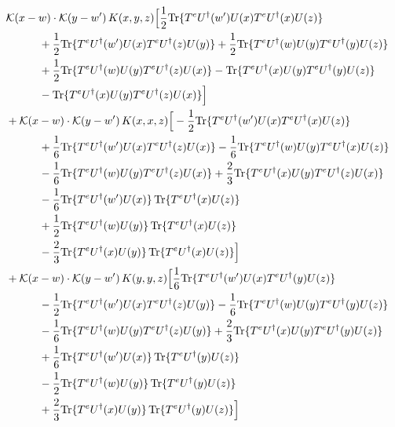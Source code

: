 \documentclass[10pt]{article}
\numberwithin{equation}{section}
\begin{document}
\begin{align}
&\mathcal K(x-w)\cdot\mathcal K(y-w')\,K(x,y,z)\Big[\frac{1}{2}{\rm Tr}\{T^eU^\dagger(w')U(x)T^eU^\dagger(x)U(z)\}\notag\\
&\quad\quad\quad+\frac{1}{2}{\rm Tr}\{T^eU^\dagger(w')U(x)T^eU^\dagger(z)U(y)\}+\frac{1}{2}{\rm Tr}\{T^eU^\dagger(w)U(y)T^eU^\dagger(y)U(z)\}\notag\\
&\quad\quad\quad+\frac{1}{2}{\rm Tr}\{T^eU^\dagger(w)U(y)T^eU^\dagger(z)U(x)\}-{\rm Tr}\{T^eU^\dagger(x)U(y)T^eU^\dagger(y)U(z)\}\notag\\
&\quad\quad\quad-{\rm Tr}\{T^eU^\dagger(x)U(y)T^eU^\dagger(z)U(x)\}\Big]\notag\\
&+\mathcal K(x-w)\cdot\mathcal K(y-w')\,K(x,x,z)\Big[-\frac{1}{2}{\rm Tr}\{T^eU^\dagger(w')U(x)T^eU^\dagger(x)U(z)\}\notag\\
&\quad\quad\quad+\frac{1}{6}{\rm Tr}\{T^eU^\dagger(w')U(x)T^eU^\dagger(z)U(x)\}-\frac{1}{6}{\rm Tr}\{T^eU^\dagger(w)U(y)T^eU^\dagger(x)U(z)\}\notag\\
&\quad\quad\quad-\frac{1}{6}{\rm Tr}\{T^eU^\dagger(w)U(y)T^eU^\dagger(z)U(x)\}+\frac{2}{3}{\rm Tr}\{T^eU^\dagger(x)U(y)T^eU^\dagger(z)U(x)\}\notag\\
&\quad\quad\quad-\frac{1}{6}{\rm Tr}\{T^eU^\dagger(w')U(x)\}\,{\rm Tr}\{T^eU^\dagger(x)U(z)\}\notag\\
&\quad\quad\quad+\frac{1}{2}{\rm Tr}\{T^eU^\dagger(w)U(y)\}\,{\rm Tr}\{T^eU^\dagger(x)U(z)\}\notag\\
&\quad\quad\quad-\frac{2}{3}{\rm Tr}\{T^eU^\dagger(x)U(y)\}\,{\rm Tr}\{T^eU^\dagger(x)U(z)\}\Big]\notag\\
&+\mathcal K(x-w)\cdot\mathcal K(y-w')\,K(y,y,z)\Big[\frac{1}{6}{\rm Tr}\{T^eU^\dagger(w')U(x)T^eU^\dagger(y)U(z)\}\notag\\
&\quad\quad\quad-\frac{1}{2}{\rm Tr}\{T^eU^\dagger(w')U(x)T^eU^\dagger(z)U(y)\}-\frac{1}{6}{\rm Tr}\{T^eU^\dagger(w)U(y)T^eU^\dagger(y)U(z)\}\notag\\
&\quad\quad\quad-\frac{1}{6}{\rm Tr}\{T^eU^\dagger(w)U(y)T^eU^\dagger(z)U(y)\}+\frac{2}{3}{\rm Tr}\{T^eU^\dagger(x)U(y)T^eU^\dagger(y)U(z)\}\notag\\
&\quad\quad\quad+\frac{1}{6}{\rm Tr}\{T^eU^\dagger(w')U(x)\}\,{\rm Tr}\{T^eU^\dagger(y)U(z)\}\notag\\
&\quad\quad\quad-\frac{1}{2}{\rm Tr}\{T^eU^\dagger(w)U(y)\}\,{\rm Tr}\{T^eU^\dagger(y)U(z)\}\notag\\
&\quad\quad\quad+\frac{2}{3}{\rm Tr}\{T^eU^\dagger(x)U(y)\}\,{\rm Tr}\{T^eU^\dagger(y)U(z)\}\Big]\notag\\

\end{align}
\end{document}
